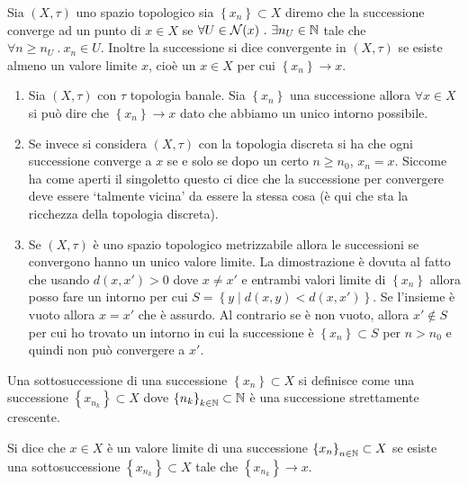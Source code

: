 \begin{definition}
	Sia $(X, \tau)$ uno spazio topologico sia $\left\{x_n\right\} \subset X$ diremo che la successione converge ad un punto di $x \in X$ se $\forall U \in \mathcal{N}(x)\ .\ \exists n_U \in \mathbb{N}$ tale che $\forall n \ge n_U\ .\ x_n \in U$. Inoltre la successione si dice convergente in $(X,\tau)$ se esiste almeno un valore limite $x$, cioè un $x \in X$ per cui $\left\{x_n\right\} \rightarrow x$.
\end{definition}

\begin{example}
\begin{enumerate}
	\item Sia $(X,\tau)$ con $\tau$ topologia banale. Sia $\left\{x_n\right\}$ una 
		successione allora $\forall x \in X$ si può dire che $\left\{x_n\right\} 
		\rightarrow x$ dato che abbiamo un unico intorno possibile. 
	\item Se invece si considera $(X,\tau)$ con la topologia discreta si 
		ha che ogni successione converge a $x$ se e solo se dopo un certo 
		$n \ge n_0$, $x_n = x$. Siccome ha come aperti il singoletto questo ci 
		dice che la successione per convergere deve essere `talmente vicina' da 
		essere la stessa cosa (è qui che sta la ricchezza della topologia 
		discreta).
	\item Se $(X,\tau)$ è uno spazio topologico metrizzabile allora le 
		successioni se convergono hanno un unico valore limite. La 
		dimostrazione è dovuta al fatto che usando $d(x,x') > 0$ dove 
		$x \neq x' $ e entrambi valori limite di $\left\{x_n\right\}$ allora posso 
		fare un intorno per cui $S = \left\{y\; |\; d(x, y) < d(x,x')\right\}$. Se 
		l'insieme è vuoto allora $x = x'$ che è assurdo. Al contrario se 
		è non vuoto, allora $x' \not\in S$ per cui ho trovato un intorno 
		in cui la successione è $\left\{x_n\right\} \subset S$ per $n > n_0$ e quindi 
		non può convergere a $x'$. 
\end{enumerate}
\end{example}

\begin{definition}
	Una sottosuccessione di una successione $\left\{x_n\right\} \subset X$ si definisce come una successione $\left\{x_{n_k}\right\} \subset X$ dove $\left\{n_k\right\}_{k\in \mathbb{N}} \subset \mathbb{N}$ è una successione strettamente crescente. 
\end{definition}

\begin{definition}
	Si dice che $x \in X$ è un valore limite di una successione $\left\{x_n\right\}_{n\in \mathbb{N}} \subset X$ se esiste una sottosuccessione $\left\{x_{n_k}\right\} \subset X$ tale che $\left\{x_{n_k}\right\} \rightarrow x$.
\end{definition}

